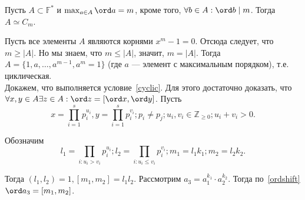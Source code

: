 \documentclass[12pt,a4paper]{article}
\begin{document}
\lemma Пусть $A\subset \mathbb F ^*$ и $\max_{a\in A}\ord a=m$, кроме того, $\forall b\in A:\ord b\mid m$. Тогда $A\simeq C_m$.\label{cyclic}

\proof Пусть все элементы $A$ являются корнями $x^m-1=0$. Отсюда следует, что $m\geq |A|$. Но мы знаем, что $m\leq |A|$, значит, $m=|A|$. Тогда $A=\{1,a,\ldots ,a^{m-1},a^m=1\}$ (где $a$ --- элемент с максимальным порядком), т.е. циклическая.\QEDA\\

 Докажем, что выполняется условие~\ref{cyclic}. Для этого достаточно доказать, что $\forall x,y\in A\exists z\in A:\ord z=[\ord x,\ord y]$. Пусть \[
	x=\prod_{i=1}^s p_i^{u_i},y=\prod_{i=1}^s p_i^{v_i};p_i\neq p_j;u_i,v_i\in \mathbb Z _{\geq 0};u_i+v_i>0.
\]

Обозначим \[
	l_1=\prod_{i:u_i>v_i}p_i^{u_i};l_2=\prod_{i:u_i\leq v_i}p_i^{v_i};m_1=l_1k_1;m_2=l_2k_2.
\]

Тогда $(l_1,l_2)=1,[m_1,m_2]=l_1l_2$. Рассмотрим $a_3=a_1^{k_1}\cdot a_2^{k_2}$. Тогда по~\ref{ordshift} $\ord a_3=[m_1,m_2]$.\QEDA\\
\end{document}
